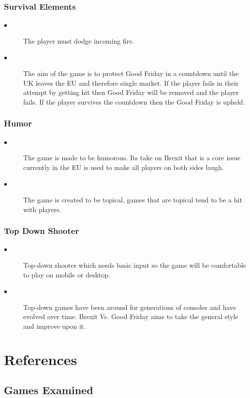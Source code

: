 \documentclass[a4paper]{scrreprt}
\begin{document}
\subsection{Survival Elements}
\begin{description}
\item[$\bullet$] The player must dodge incoming fire.
\item[$\bullet$] The aim of the game is to protect Good Friday in a countdown until the UK leaves the EU and therefore single market. 
If the player fails in their attempt by getting hit then Good Friday will be removed and the player fails. 
If the player survives the countdown then the Good Friday is upheld.
\end{description}

\subsection{Humor}
\begin{description}
\item[$\bullet$] The game is made to be humorous. Its take on Brexit that is a core issue currently in the EU is used to make all players on both sides laugh.
\item[$\bullet$] The game is created to be topical, games that are topical tend to be a hit with players.
\end{description}

\subsection{Top Down Shooter}
\begin{description}
\item[$\bullet$] Top-down shooter which needs basic input so the game will be comfortable to play on mobile or desktop.
\item[$\bullet$] Top-down games have been around for generations of consoles and have evolved over time. Brexit Vs. Good Friday aims to take the general style and improve upon it.
\end{description}

\chapter{References} 

\section{Games Examined}
\end{document}
